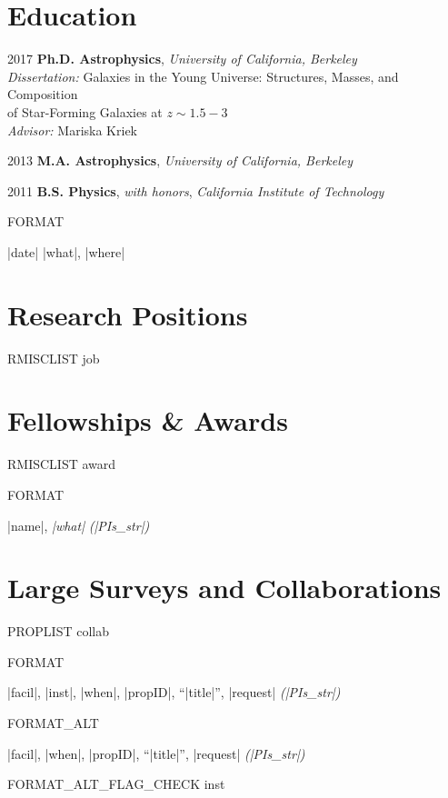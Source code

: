 \documentclass[line,10pt]{article}
\def\sectionfont{\fontsize{11pt}{0pt}\bf}
\newlength{\mainindent} \setlength{\mainindent}{15pt}
\newlength{\mainnegindent} \setlength{\mainnegindent}{-20pt}
\newlength{\mainextraindent} \setlength{\mainextraindent}{35pt}
\newlength{\contentindent} \setlength{\contentindent}{17ex}
\newlength{\entrywidth} \setlength{\entrywidth}{\dimexpr\textwidth-\mainextraindent\relax}
\let\origsection\section
\renewcommand\section{\starsection}
\newcommand\starsection[1]
{\sectionprelude\origsection*{\sectionfont#1}\sectionpostlude}
\newcommand\sectionprelude{%
  \vspace{\sectionskip}
}
\newcommand\sectionpostlude{%
  \vspace{\sectionafterskip}
}
\newenvironment{datelist}{
  \begingroup
  \raggedright
  \begin{description}[labelindent=\mainindent,leftmargin=\contentindent,
      style=sameline,font=\normalfont,topsep=0pt,partopsep=1pt, 
      parsep=0pt,
      itemsep=0pt]
}{
  \end{description}
  \endgroup
}
\begin{document}
\section{Education}
\begin{datelist}
\item[2017]
  \textbf{Ph.D. Astrophysics}, \emph{University of California, Berkeley} \\
  \emph{Dissertation:} Galaxies in the Young Universe: Structures, Masses, and Composition\\
  \hskip 2cm of Star-Forming Galaxies at $z\sim1.5-3$\\
  \emph{Advisor:} Mariska Kriek
\item[2013]
  \textbf{M.A. Astrophysics}, \emph{University of California, Berkeley}
\item[2011]
  \textbf{B.S. Physics}, \emph{with honors}, \emph{California Institute of Technology}
\end{datelist}



FORMAT \item[|date|] |what|, |where|

\section{Research Positions}
\begin{datelist}
RMISCLIST job
\end{datelist}


\section{Fellowships \& Awards}
\begin{datelist}
RMISCLIST award
\end{datelist}


FORMAT \item |name|, \emph{|what|} \emph{(|PIs_str|)}
\section{Large Surveys and Collaborations}
\begin{itemize}[label={},itemindent=\mainnegindent,leftmargin=\mainextraindent,partopsep=1pt]  %
PROPLIST collab
\end{itemize}


FORMAT \parbox{\entrywidth}{\item |facil|, |inst|, |when|, |propID|, ``|title|'', |request| \emph{(|PIs_str|)}}\vskip 3.5pt
FORMAT_ALT \parbox{\entrywidth}{\item |facil|, |when|, |propID|, ``|title|'', |request| \emph{(|PIs_str|)}}\vskip 3.5pt
FORMAT_ALT_FLAG_CHECK inst
\end{document}
